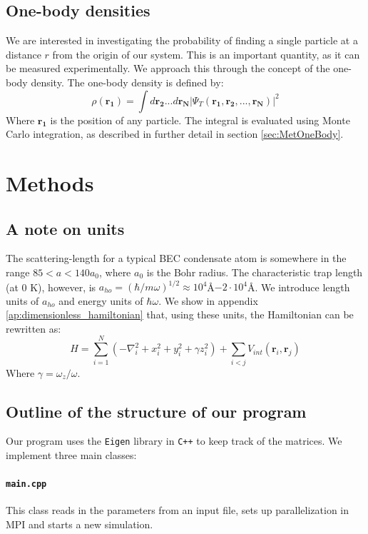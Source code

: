 \documentclass[a4paper, 10pt]{article}
\begin{document}
	\subsection{One-body densities}
	We are interested in investigating the probability of finding a single particle at a distance $r$ from the origin of our system. This is an important quantity, as it can be measured experimentally. We approach this through the concept of the one-body density. The one-body density is defined by:
	\begin{equation}\label{eq:OneBodyDensity}
	\rho(\boldsymbol{r_1})=\int d\boldsymbol{r_2}...d\boldsymbol{r_N}|\Psi_T(\boldsymbol{r_1},\boldsymbol{r_2},...,\boldsymbol{r_N})|^2
	\end{equation}
	Where $\boldsymbol{r_1}$ is the position of any particle. The integral is evaluated using Monte Carlo integration, as described in further detail in section \ref{sec:MetOneBody}.
	
	
	
	
	\section{Methods}\label{Method_section}
	\subsection{A note on units}
	The scattering-length for a typical BEC condensate atom is somewhere in the range $85<a<140a_0$, where $a_0$ is the Bohr radius. The characteristic trap length (at 0 K), however, is $a_{ho}=(\hbar/m\omega)^{1/2}\approx 10^{4}$Å$-2\cdot 10^{4}$Å. We introduce length units of $a_{ho}$ and energy units of $\hbar \omega$. We show in appendix \ref{ap:dimensionless_hamiltonian} that, using these units, the Hamiltonian can be rewritten as:
	\begin{equation}\label{eq:Hamiltonian_dimensionless}
	H=\sum_{i=1}^N\left(-\nabla_i^2 + x_i^2+y_i^2+\gamma z_i^2\right)+\sum_{i<j}V_{int}(\boldsymbol{r}_i, \boldsymbol{r}_j)
	\end{equation}
	Where $\gamma=\omega_z/\omega$.
	\subsection{Outline of the structure of our program}
	Our program uses the \texttt{Eigen} library in \texttt{C++} to keep track of the matrices. We implement three main classes:\\
	\paragraph{\texttt{main.cpp}}
	This class reads in the parameters from an input file, sets up parallelization in MPI and starts a new simulation.\\
	\linebreak
\end{document}
